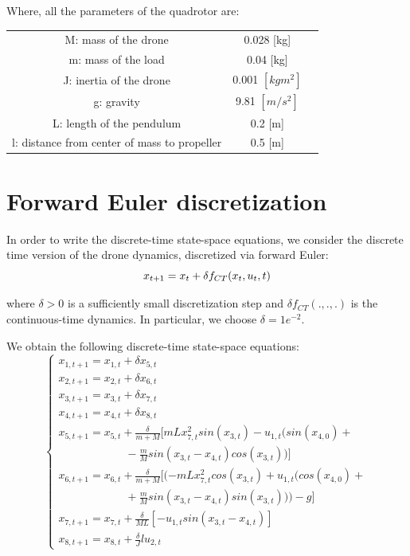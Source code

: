 Where, all the parameters of the quadrotor are: 

\begin{center}
\begin{tabular}{ |c|c|c| } 
 \hline
 M: mass of the drone & 0.028 [kg] \\ 
 m: mass of the load & 0.04 [kg] \\ 
 J: inertia of the drone & 0.001 $[kg m^2]$\\ 
 g: gravity & 9.81 $[m/s^2]$\\ 
 L: length of the pendulum & 0.2 [m]\\ 
 l: distance from center of mass to propeller & 0.5 [m]\\ 
 \hline
\end{tabular}
\end{center}


\section{Forward Euler discretization}
In order to write the discrete-time state-space equations, we consider the discrete time version of the drone dynamics, discretized via forward Euler: 
\[
x_{t+1}  = x_t + \delta f_{CT} (x_t, u_t, t)\\
\]

where $\delta > 0$ is a sufficiently small discretization step and $\delta f_{CT} (., ., .)$ is the continuous-time dynamics. In particular, we choose $\delta = 1e^{-2}$. 


We obtain the following discrete-time state-space equations: 
\[
\begin{cases}
x_{1,t+1} = x_{1,t} + \delta x_{5,t} \\
x_{2,t+1} = x_{2,t} + \delta x_{6,t} \\
x_{3,t+1} = x_{3,t} + \delta x_{7,t} \\
x_{4,t+1} = x_{4,t} + \delta x_{8,t} \\
x_{5,t+1} = x_{5,t} + \frac{\delta}{m+M} [m L x_{7,t}^2 sin(x_{3,t}) - u_{1,t} (sin(x_{4,0}) + \\ \qquad \qquad \qquad - \frac{m}{M} sin(x_{3,t} - x_{4,t}) cos(x_{3,t}))]  \\
x_{6,t+1} = x_{6,t} + \frac{\delta}{m+M} [(-m L x_{7,t}^2 cos(x_{3,t}) + u_{1,t} (cos(x_{4,0}) + \\
\qquad \qquad \qquad +\frac{m}{M} sin(x_{3,t} - x_{4,t}) sin(x_{3,t})))-g] \\
x_{7,t+1} = x_{7,t} + \frac{\delta}{M L} [-u_{1,t} sin(x_{3,t} - x_{4,t})] \\
x_{8,t+1} = x_{8,t} + \frac{\delta}{J} l u_{2,t}
\end{cases} 
\]

